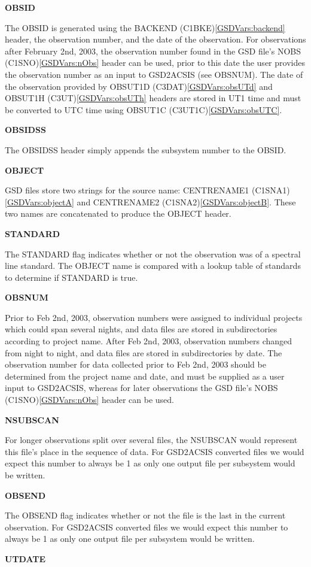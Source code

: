 \documentclass[twoside,11pt]{article}
\renewcommand{\_}{\texttt{\symbol{95}}}
\newcommand{\objectA}{CENTRE\_NAME\_1 (C1SNA1)}
\newcommand{\objectB}{CENTRE\_NAME\_2 (C1SNA2)}
\newcommand{\nObs}{NOBS (C1SNO)}
\newcommand{\backend}{BACKEND (C1BKE)}
\newcommand{\obsUTd}{OBS\_UT1D (C3DAT)}
\newcommand{\obsUTh}{OBS\_UT1H (C3UT)}
\newcommand{\obsUTC}{OBS\_UT1C (C3UT1C)}
\renewcommand{\objectA}{CENTRE\_NAME\_1 (C1SNA1)\ref{GSDVars:objectA}}
\renewcommand{\objectB}{CENTRE\_NAME\_2 (C1SNA2)\ref{GSDVars:objectB}}
\renewcommand{\nObs}{NOBS (C1SNO)\ref{GSDVars:nObs}}
\renewcommand{\backend}{BACKEND (C1BKE)\ref{GSDVars:backend}}
\renewcommand{\obsUTd}{OBS\_UT1D (C3DAT)\ref{GSDVars:obsUTd}}
\renewcommand{\obsUTh}{OBS\_UT1H (C3UT)\ref{GSDVars:obsUTh}}
\renewcommand{\obsUTC}{OBS\_UT1C (C3UT1C)\ref{GSDVars:obsUTC}}
\begin{document}
{\bf OBSID}

The OBSID is generated using the \backend{} header, the observation number, and the date of the observation.  For observations after February 2nd, 2003, the observation number found in the GSD file's \nObs{} header can be used, prior to this date the user provides the observation number as an input to GSD2ACSIS (see OBSNUM).  The date of the observation provided by \obsUTd{} and \obsUTh{} headers are stored in UT1 time and must be converted to UTC time using \obsUTC.

{\bf OBSIDSS}

The OBSIDSS header simply appends the subsystem number to the OBSID.

{\bf OBJECT}

GSD files store two strings for the source name: \objectA{} and \objectB.  These two names are concatenated to produce the OBJECT header.  

{\bf STANDARD}

The STANDARD flag indicates whether or not the observation was of a spectral line standard.  The OBJECT name is compared with a lookup table of standards to determine if STANDARD is true.

{\bf OBSNUM}

Prior to Feb 2nd, 2003, observation numbers were assigned to individual projects which could span several nights, and data files are stored in subdirectories according to project name.  After Feb 2nd, 2003, observation numbers changed from night to night, and data files are stored in subdirectories by date.  The observation number for data collected prior to Feb 2nd, 2003 should be determined from the project name and date, and must be supplied as a user input to GSD2ACSIS, whereas for later observations the GSD file's \nObs{} header can be used.

{\bf NSUBSCAN}

For longer observations split over several files, the NSUBSCAN would represent this file's place in the sequence of data.  For GSD2ACSIS converted files we would expect this number to always be 1 as only one output file per subsystem would be written. 

{\bf OBSEND}

The OBSEND flag indicates whether or not the file is the last in the current observation.  For GSD2ACSIS converted files we would expect this number to always be 1 as only one output file per subsystem would be written.

{\bf UTDATE}
\end{document}
